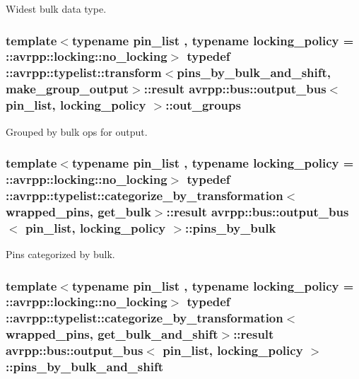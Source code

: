 Widest bulk data type. 

\hypertarget{structavrpp_1_1bus_1_1output__bus_adcc13b4cd461b37b69491bf1ce2abeca}{
\subsubsection[{out\_\-groups}]{\setlength{\rightskip}{0pt plus 5cm}template$<$typename pin\_\-list , typename locking\_\-policy  = ::avrpp::locking::no\_\-locking$>$ typedef ::avrpp::typelist::transform$<${\bf pins\_\-by\_\-bulk\_\-and\_\-shift}, {\bf make\_\-group\_\-output}$>$::result {\bf avrpp::bus::output\_\-bus}$<$ pin\_\-list, locking\_\-policy $>$::{\bf out\_\-groups}}}
\label{structavrpp_1_1bus_1_1output__bus_adcc13b4cd461b37b69491bf1ce2abeca}


Grouped by bulk ops for output. 

\hypertarget{structavrpp_1_1bus_1_1output__bus_ac2d226d9ce0a1eb0c678469b49799286}{
\subsubsection[{pins\_\-by\_\-bulk}]{\setlength{\rightskip}{0pt plus 5cm}template$<$typename pin\_\-list , typename locking\_\-policy  = ::avrpp::locking::no\_\-locking$>$ typedef ::avrpp::typelist::categorize\_\-by\_\-transformation$<${\bf wrapped\_\-pins}, {\bf get\_\-bulk}$>$::result {\bf avrpp::bus::output\_\-bus}$<$ pin\_\-list, locking\_\-policy $>$::{\bf pins\_\-by\_\-bulk}}}
\label{structavrpp_1_1bus_1_1output__bus_ac2d226d9ce0a1eb0c678469b49799286}


Pins categorized by bulk. 

\hypertarget{structavrpp_1_1bus_1_1output__bus_ae47617c6facd6a8a4a60a526676074e8}{
\subsubsection[{pins\_\-by\_\-bulk\_\-and\_\-shift}]{\setlength{\rightskip}{0pt plus 5cm}template$<$typename pin\_\-list , typename locking\_\-policy  = ::avrpp::locking::no\_\-locking$>$ typedef ::avrpp::typelist::categorize\_\-by\_\-transformation$<${\bf wrapped\_\-pins}, {\bf get\_\-bulk\_\-and\_\-shift}$>$::result {\bf avrpp::bus::output\_\-bus}$<$ pin\_\-list, locking\_\-policy $>$::{\bf pins\_\-by\_\-bulk\_\-and\_\-shift}}}
\label{structavrpp_1_1bus_1_1output__bus_ae47617c6facd6a8a4a60a526676074e8}


